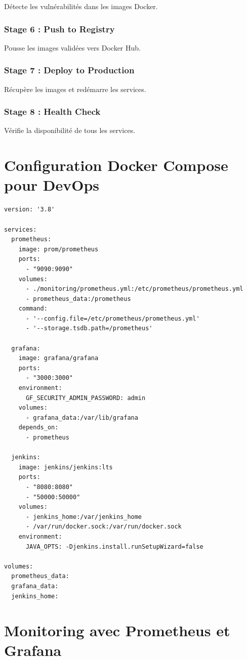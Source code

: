 \documentclass[12pt,a4paper]{report}
\begin{document}
Détecte les vulnérabilités dans les images Docker.

\subsubsection{Stage 6 : Push to Registry}

Pousse les images validées vers Docker Hub.

\subsubsection{Stage 7 : Deploy to Production}

Récupère les images et redémarre les services.

\subsubsection{Stage 8 : Health Check}

Vérifie la disponibilité de tous les services.

\section{Configuration Docker Compose pour DevOps}

\begin{lstlisting}
version: '3.8'

services:
  prometheus:
    image: prom/prometheus
    ports:
      - "9090:9090"
    volumes:
      - ./monitoring/prometheus.yml:/etc/prometheus/prometheus.yml
      - prometheus_data:/prometheus
    command:
      - '--config.file=/etc/prometheus/prometheus.yml'
      - '--storage.tsdb.path=/prometheus'

  grafana:
    image: grafana/grafana
    ports:
      - "3000:3000"
    environment:
      GF_SECURITY_ADMIN_PASSWORD: admin
    volumes:
      - grafana_data:/var/lib/grafana
    depends_on:
      - prometheus

  jenkins:
    image: jenkins/jenkins:lts
    ports:
      - "8080:8080"
      - "50000:50000"
    volumes:
      - jenkins_home:/var/jenkins_home
      - /var/run/docker.sock:/var/run/docker.sock
    environment:
      JAVA_OPTS: -Djenkins.install.runSetupWizard=false

volumes:
  prometheus_data:
  grafana_data:
  jenkins_home:
\end{lstlisting}

\section{Monitoring avec Prometheus et Grafana}
\end{document}
